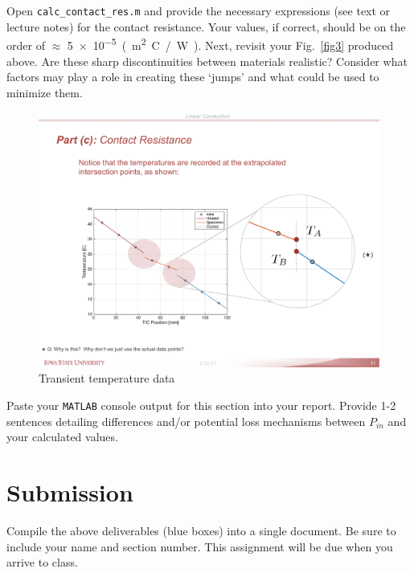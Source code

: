 \documentclass[11pt, letterpaper]{article}
\begin{document}
Open \texttt{calc\_contact\_res.m} and provide the necessary expressions (see text or lecture notes) for the contact resistance. Your values, if correct, should be on the order of $\approx $ \SI{5e-5}{(m^2 C / W)}.
Next, revisit your Fig.~\ref{fig3} produced above. Are these sharp discontinuities between materials realistic? Consider what factors may play a role in creating these `jumps' and what could be used to minimize them.
\begin{figure}[H]
    \begin{center}
        \includegraphics[width=125mm]{gfx/fig6.pdf}
    \caption{Transient temperature data}\label{fig6}
    \end{center}
\end{figure}
\begin{formal}
    \begin{deliv}  
    Paste your \texttt{MATLAB} console output for this section into your report. Provide 1-2 sentences detailing differences and/or potential loss mechanisms between $P_{in}$ and your calculated values.
    \end{deliv}
\end{formal}


\section{Submission}

Compile the above deliverables (blue boxes) into a single document. Be sure to include your name and section number. This assignment will be due when you arrive to class.
\end{document}
